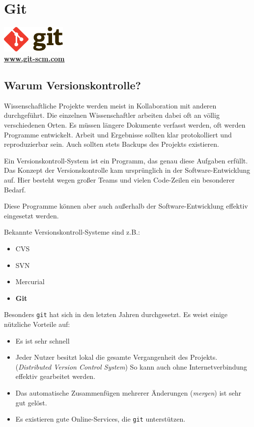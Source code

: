 \chapter{Git}
\begin{center}
    \includegraphics[width=120px]{img/git.pdf} \\
    \textbf{\href{http://git-scm.com}{www.git-scm.com}}
\end{center}

\section{Warum Versionskontrolle?}
Wissenschaftliche Projekte werden meist in Kollaboration mit anderen durchgeführt.
Die einzelnen Wissenschaftler arbeiten dabei oft an völlig verschiedenen Orten.
Es müssen längere Dokumente verfasst werden, oft werden Programme entwickelt.
Arbeit und Ergebnisse sollten klar protokolliert und reproduzierbar sein.
Auch sollten stets Backups des Projekts existieren.

Ein Versionskontroll-System ist ein Programm, das genau diese Aufgaben erfüllt.
Das Konzept der Versionskontrolle kam ursprünglich in der Software-Entwicklung auf.
Hier besteht wegen großer Teams und vielen Code-Zeilen ein besonderer Bedarf.

Diese Programme können aber auch außerhalb der Software-Entwicklung effektiv eingesetzt werden.

Bekannte Versionskontroll-Systeme sind z.B.:
\begin{itemize}
  \item CVS
  \item SVN
  \item Mercurial
  \item \textbf{Git}
\end{itemize}

Besonders \texttt{git} hat sich in den letzten Jahren durchgesetzt.
Es weist einige nützliche Vorteile auf:
\begin{itemize}
  \item Es ist sehr schnell
  \item Jeder Nutzer besitzt lokal die gesamte Vergangenheit des Projekts. (\textit{Distributed Version Control System})
    So kann auch ohne Internetverbindung effektiv gearbeitet werden.
  \item Das automatische Zusammenfügen mehrerer Änderungen (\textit{mergen}) ist sehr gut gelöst.
  \item Es existieren gute Online-Services, die \texttt{git} unterstützen.
\end{itemize}

